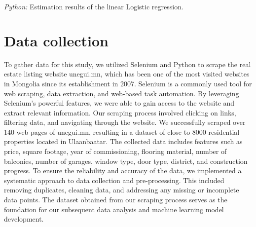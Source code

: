 \documentclass[11pt, a4paper, leqno]{article}
\begin{document}
\begin{table}[!h]
    
    \caption{\label{tab:python-summary}\emph{Python:} Estimation results of the
        linear Logistic regression.}
\end{table}




\section{Data collection} %
\label{sec:data_collection}
To gather data for this study, we utilized Selenium and Python to scrape the real estate listing website unegui.mn,
which has been one of the most visited websites in Mongolia since its establishment in 2007.
Selenium is a commonly used tool for web scraping, data extraction, and web-based task automation.
By leveraging Selenium's powerful features, we were able to gain access to the website and extract relevant information.
Our scraping process involved clicking on links, filtering data, and navigating through the website.
We successfully scraped over 140 web pages of unegui.mn, resulting in a dataset of close to 8000 residential properties located in Ulaanbaatar.
The collected data includes features such as price, square footage, year of commissioning, flooring material,
number of balconies, number of garages, window type, door type, district, and construction progress.
To ensure the reliability and accuracy of the data, we implemented a systematic approach to data collection and pre-processing.
This included removing duplicates, cleaning data, and addressing any missing or incomplete data points.
The dataset obtained from our scraping process serves as the foundation for our subsequent data analysis and machine learning model development.

\printbibliography
{}



\end{document}

